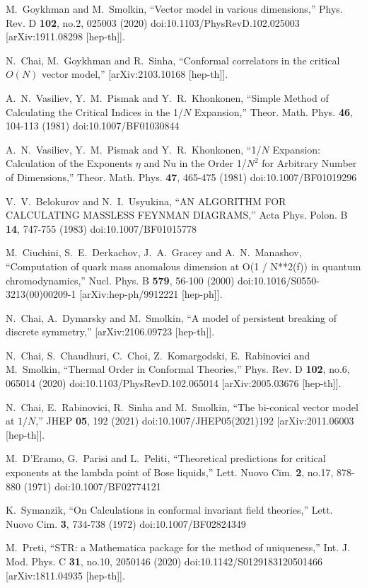 \documentclass[aps,amsmath,amssymb,prd,showpacs,floatfix,preprint,superscriptaddress,nofootinbib,12pt]{article}
\begin{document}
\begin{thebibliography}{99}
M.~Goykhman and M.~Smolkin,
``Vector model in various dimensions,''
Phys. Rev. D \textbf{102}, no.2, 025003 (2020)
doi:10.1103/PhysRevD.102.025003
[arXiv:1911.08298 [hep-th]].

N.~Chai, M.~Goykhman and R.~Sinha,
``Conformal correlators in the critical $O(N)$ vector model,''
[arXiv:2103.10168 [hep-th]].

A.~N.~Vasiliev, Y.~M.~Pismak and Y.~R.~Khonkonen,
``Simple Method of Calculating the Critical Indices in the 1/$N$ Expansion,''
Theor. Math. Phys. \textbf{46}, 104-113 (1981)
doi:10.1007/BF01030844

A.~N.~Vasiliev, Y.~M.~Pismak and Y.~R.~Khonkonen,
``1/$N$ Expansion: Calculation of the Exponents $\eta$ and Nu in the Order 1/$N^2$ for Arbitrary Number of Dimensions,''
Theor. Math. Phys. \textbf{47}, 465-475 (1981)
doi:10.1007/BF01019296

V.~V.~Belokurov and N.~I.~Usyukina,
``AN ALGORITHM FOR CALCULATING MASSLESS FEYNMAN DIAGRAMS,''
Acta Phys. Polon. B \textbf{14}, 747-755 (1983)
doi:10.1007/BF01015778

M.~Ciuchini, S.~E.~Derkachov, J.~A.~Gracey and A.~N.~Manashov,
``Computation of quark mass anomalous dimension at O(1 / N**2(f)) in quantum chromodynamics,''
Nucl. Phys. B \textbf{579}, 56-100 (2000)
doi:10.1016/S0550-3213(00)00209-1
[arXiv:hep-ph/9912221 [hep-ph]].

N.~Chai, A.~Dymarsky and M.~Smolkin,
``A model of persistent breaking of discrete symmetry,''
[arXiv:2106.09723 [hep-th]].

N.~Chai, S.~Chaudhuri, C.~Choi, Z.~Komargodski, E.~Rabinovici and M.~Smolkin,
``Thermal Order in Conformal Theories,''
Phys. Rev. D \textbf{102}, no.6, 065014 (2020)
doi:10.1103/PhysRevD.102.065014
[arXiv:2005.03676 [hep-th]].

N.~Chai, E.~Rabinovici, R.~Sinha and M.~Smolkin,
``The bi-conical vector model at $1/N$,''
JHEP \textbf{05}, 192 (2021)
doi:10.1007/JHEP05(2021)192
[arXiv:2011.06003 [hep-th]].

M.~D'Eramo, G.~Parisi and L.~Peliti,
``Theoretical predictions for critical exponents at the lambda point of Bose liquids,''
Lett. Nuovo Cim. \textbf{2}, no.17, 878-880 (1971)
doi:10.1007/BF02774121

K.~Symanzik,
``On Calculations in conformal invariant field theories,''
Lett. Nuovo Cim. \textbf{3}, 734-738 (1972)
doi:10.1007/BF02824349

M.~Preti,
``STR: a Mathematica package for the method of uniqueness,''
Int. J. Mod. Phys. C \textbf{31}, no.10, 2050146 (2020)
doi:10.1142/S0129183120501466
[arXiv:1811.04935 [hep-th]].

\end{thebibliography}
\end{document}
